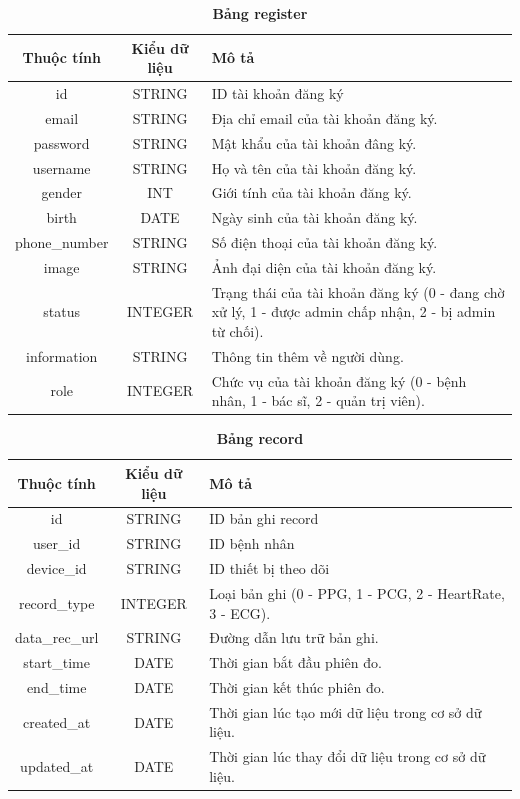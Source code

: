 \begin{table}[H]
  \caption{\bfseries \fontsize{12pt}{0pt}\selectfont Bảng register}
  \centering
  \begin{tabularx}{0.9\textwidth}{|c|c|X|}
    \hline
    \textbf{Thuộc tính} & \textbf{Kiểu dữ liệu} & \textbf{Mô tả} \\
    \hline
    id & STRING & ID tài khoản đăng ký \\
    \hline
    email & STRING & Địa chỉ email của tài khoản đăng ký. \\
    \hline
    password & STRING & Mật khẩu của tài khoản đâng ký. \\
    \hline
    username & STRING & Họ và tên của tài khoản đăng ký. \\
    \hline
    gender & INT & Giới tính của tài khoản đăng ký. \\
    \hline
    birth & DATE & Ngày sinh của tài khoản đăng ký. \\
    \hline
    phone\_number & STRING & Số điện thoại của tài khoản đăng ký. \\
    \hline
    image & STRING & Ảnh đại diện của tài khoản đăng ký. \\
    \hline
    status & INTEGER & Trạng thái của tài khoản đăng ký (0 - đang chờ xử lý, 1 - được admin chấp nhận, 2 - bị admin từ chối). \\
    \hline
    information & STRING & Thông tin thêm về người dùng. \\
    \hline
    role & INTEGER & Chức vụ của tài khoản đăng ký (0 - bệnh nhân, 1 - bác sĩ, 2 - quản trị viên).\\
    \hline
  \end{tabularx}
\end{table}

\begin{table}[H]
  \caption{\bfseries \fontsize{12pt}{0pt}\selectfont Bảng record}
  \centering
  \begin{tabularx}{0.9\textwidth}{|c|c|X|}
    \hline
    \textbf{Thuộc tính} & \textbf{Kiểu dữ liệu} & \textbf{Mô tả} \\
    \hline
    id & STRING & ID bản ghi record  \\
    \hline
    user\_id & STRING & ID bệnh nhân  \\
    \hline
    device\_id & STRING & ID thiết bị theo dõi  \\
    \hline
    record\_type & INTEGER & Loại bản ghi (0 - PPG, 1 - PCG, 2 - HeartRate, 3 - ECG). \\
    \hline
    data\_rec\_url & STRING & Đường dẫn lưu trữ bản ghi. \\
    \hline
    start\_time & DATE & Thời gian bắt đầu phiên đo. \\
    \hline
    end\_time & DATE & Thời gian kết thúc phiên đo. \\
    \hline
    created\_at & DATE & Thời gian lúc tạo mới dữ liệu trong cơ sở dữ liệu. \\
    \hline
    updated\_at & DATE & Thời gian lúc thay đổi dữ liệu trong cơ sở dữ liệu. \\
    \hline
  \end{tabularx}
\end{table}

